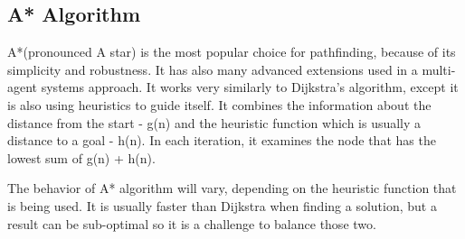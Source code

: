 \subsection{A* Algorithm}
A*(pronounced A star) is the most popular choice for pathfinding, because of its simplicity and robustness. It has also many advanced extensions used in a multi-agent systems approach. It works very similarly to Dijkstra's algorithm, except it is also using heuristics to guide itself. It combines the information about the distance from the start - g(n) and the heuristic function which is usually a distance to a goal - h(n). In each iteration, it examines the node that has the lowest sum of g(n) + h(n)\cite{basic_2}.

The behavior of A* algorithm will vary, depending on the heuristic function that is being used. It is usually faster than Dijkstra when finding a solution, but a result can be sub-optimal so it is a challenge to balance those two.
